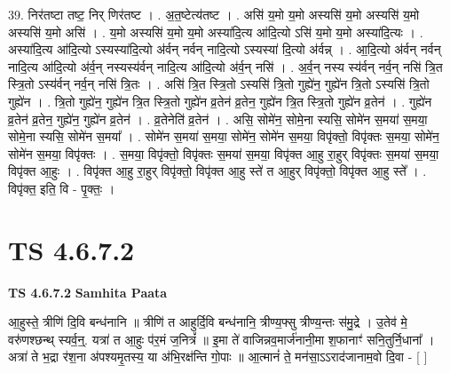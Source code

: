 \documentclass[17pt]{extarticle}
\begin{document}
39. निर॑तष्टा तष्ट॒ निर् णिर॑तष्ट । . अ॒त॒ष्टेत्य॑तष्ट । . असि॑ य॒मो य॒मो अस्यसि॑ य॒मो अस्यसि॑ य॒मो अस्यसि॑ य॒मो असि॑ । . य॒मो अस्यसि॑ य॒मो य॒मो अस्या॑दि॒त्य आ॑दि॒त्यो ऽसि॑ य॒मो य॒मो अस्या॑दि॒त्यः । . अस्या॑दि॒त्य आ॑दि॒त्यो ऽस्यस्या॑दि॒त्यो अ॑र्वन् नर्वन् नादि॒त्यो ऽस्यस्या॑ दि॒त्यो अ॑र्वन्न् । . आ॒दि॒त्यो अ॑र्वन् नर्वन् नादि॒त्य आ॑दि॒त्यो अ॑र्व॒न् नस्यस्य॑र्वन् नादि॒त्य आ॑दि॒त्यो अ॑र्व॒न् नसि॑ । . अ॒र्व॒न् नस्य स्य॑र्वन् नर्व॒न् नसि॑ त्रि॒त स्त्रि॒तो ऽस्य॑र्वन् नर्व॒न् नसि॑ त्रि॒तः । . असि॑ त्रि॒त स्त्रि॒तो ऽस्यसि॑ त्रि॒तो गुह्ये॑न॒ गुह्ये॑न त्रि॒तो ऽस्यसि॑ त्रि॒तो गुह्ये॑न । . त्रि॒तो गुह्ये॑न॒ गुह्ये॑न त्रि॒त स्त्रि॒तो गुह्ये॑न व्र॒तेन॑ व्र॒तेन॒ गुह्ये॑न त्रि॒त स्त्रि॒तो गुह्ये॑न व्र॒तेन॑ । . गुह्ये॑न व्र॒तेन॑ व्र॒तेन॒ गुह्ये॑न॒ गुह्ये॑न व्र॒तेन॑ । . व्र॒तेनेति॑ व्र॒तेन॑ । . असि॒ सोमे॑न॒ सोमे॒ना स्यसि॒ सोमे॑न स॒मया॑ स॒मया॒ सोमे॒ना स्यसि॒ सोमे॑न स॒मया᳚ । . सोमे॑न स॒मया॑ स॒मया॒ सोमे॑न॒ सोमे॑न स॒मया॒ विपृ॑क्तो॒ विपृ॑क्तः स॒मया॒ सोमे॑न॒ सोमे॑न स॒मया॒ विपृ॑क्तः । . स॒मया॒ विपृ॑क्तो॒ विपृ॑क्तः स॒मया॑ स॒मया॒ विपृ॑क्त आ॒हु रा॒हुर् विपृ॑क्तः स॒मया॑ स॒मया॒ विपृ॑क्त आ॒हुः । . विपृ॑क्त आ॒हु रा॒हुर् विपृ॑क्तो॒ विपृ॑क्त आ॒हु स्ते॑ त आ॒हुर् विपृ॑क्तो॒ विपृ॑क्त आ॒हु स्ते᳚ । . विपृ॑क्त॒ इति॒ वि - पृ॒क्तः॒ । \newline
\pagebreak
{}

\section{ TS 4.6.7.2 }

\textbf{TS 4.6.7.2 } \newline
\textbf{Samhita Paata} \newline

आ॒हुस्ते॒ त्रीणि॑ दि॒वि बन्ध॑नानि ॥ त्रीणि॑ त आहुर्दि॒वि बन्ध॑नानि॒ त्रीण्य॒फ्सु त्रीण्य॒न्तः स॑मु॒द्रे । उ॒तेव॑ मे॒ वरु॑णश्छन्थ् स्यर्व॒न्॒. यत्रा॑ त आ॒हुः प॑र॒मं ज॒नित्रं᳚ ॥ इ॒मा ते॑ वाजिन्नव॒मार्ज॑नानी॒मा श॒फानाꣳ॑ सनि॒तुर्नि॒धाना᳚ । अत्रा॑ ते भ॒द्रा र॑श॒ना अ॑पश्यमृ॒तस्य॒ या अ॑भि॒रक्ष॑न्ति गो॒पाः ॥ आ॒त्मानं॑ ते॒ मन॑सा॒ऽऽराद॑जानाम॒वो दि॒वा - [  ] \newline
\end{document}
